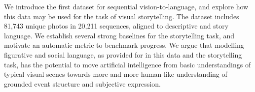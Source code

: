 We introduce the first dataset for sequential vision-to-language, and explore how this data may be used for the task of visual storytelling. The dataset includes 81,743 unique photos in 20,211 sequences, aligned to descriptive and story language. We establish several strong baselines for the storytelling task, and motivate an automatic metric to benchmark progress. We argue that modelling figurative and social language, as provided for in this data and the storytelling task, has the potential to move artificial intelligence from basic understandings of typical visual scenes towards more and more human-like understanding of grounded event structure and subjective expression.
